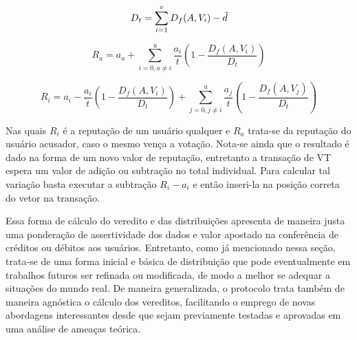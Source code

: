 \begin{equation}
    D_t = \sum_{i = 1}^v D_f(A, V_i) - \Tilde{d}
\end{equation}

\begin{equation}
    R_a = a_a + \sum_{i = 0, a \neq i}^u \frac{a_i}{t}(1 - \frac{D_f(A, V_i)}{D_t}) 
\end{equation}

\begin{equation}
    R_i = a_i - \frac{a_i}{t}(1 - \frac{D_f(A, V_i)}{D_t}) + \sum_{j = 0, j \neq i}^u \frac{a_j}{t}(1 - \frac{D_f(A, V_j)}{D_t}) 
\end{equation}

Nas quais $R_i$ é a reputação de um usuário qualquer e $R_a$ trata-se da reputação do usuário acusador, caso o mesmo vença a votação. Nota-se ainda que o resultado é dado na forma de um novo valor de reputação, entretanto a transação de \ac{VT} espera um valor de adição ou subtração no total individual. Para calcular tal variação basta executar a subtração $R_i - a_i$ e então inseri-la na posição correta do vetor na transação.

Essa forma de cálculo do veredito e das distribuições apresenta de maneira justa uma ponderação de assertividade dos dados e valor apostado na conferência de créditos ou débitos aos usuários. Entretanto, como já mencionado nessa seção, trata-se de uma forma inicial e básica de distribuição que pode eventualmente em trabalhos futuros ser refinada ou modificada, de modo a melhor se adequar a situações do mundo real. De maneira generalizada, o protocolo trata também de maneira agnóstica o cálculo dos vereditos, facilitando o emprego de novas abordagens interessantes desde que sejam previamente testadas e aprovadas em uma análise de ameaças teórica.


%
            



